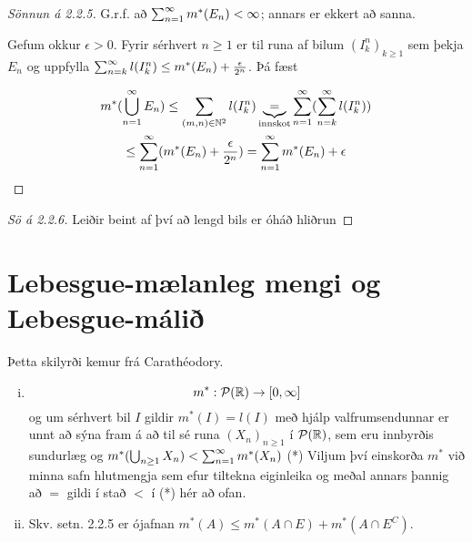 \documentclass[12pt]{book}
\newcommand{\cP}{\mathcal{P}}
\begin{document}
\begin{proof}[Sönnun á 2.2.5]
  G.r.f. að $\sum_{n = 1}^{\infty} m^*(E_n) < \infty$; annars er ekkert að sanna.

      Gefum okkur $\epsilon > 0$. Fyrir sérhvert $n \geq 1$ er til runa af bilum
      $(I^n_k)_{k \geq 1}$ sem þekja $E_n$ og uppfylla
      $\sum_{n = {k}}^{\infty} l(I^n_k) \leq m^*(E_n) + \frac{\epsilon}{2^n}$. Þá fæst

      \begin{gather*}
        m^*(\bigcup_{n=1}^{\infty} E_n) \leq \sum_{(m,n) \in \mathbb{N}^2} l(I_k^n)
          \underbrace{=}_{\text{innskot}} \sum_{n = 1}^{\infty} (\sum_{n = {k}}^{\infty} l(I^n_k))\\
          \leq \sum_{n = 1}^{\infty} (m^*(E_n) + \frac{\epsilon}{2^n}) = \sum_{n = 1}^{\infty} m^*(E_n) + \epsilon
      \end{gather*}
        
\end{proof}
\begin{proof}[Sö á 2.2.6]
     Leiðir beint af því að lengd bils er óháð hliðrun 
\end{proof}

\section{Lebesgue-mælanleg mengi og Lebesgue-málið}

Þetta skilyrði kemur frá Carathéodory.

\begin{ath} 
  \begin{enumerate}[(i)] 
  \item \[m^*:  \cP(\R) \to [0, \infty] \]
    og um sérhvert bil $I$ gildir $m^{*}(I) = l(I)$
    með hjálp valfrumsendunnar er unnt að sýna fram á að til sé runa
    $(X_n)_{n\geq1}$ í $\cP(\R)$, sem eru innbyrðis sundurlæg og $m^*(\bigcup_{n\geq1}X_n) < \sum_{n = 1}^{\infty} m^*(X_n)$ (*)
    Viljum því einskorða $ m^* $ við minna safn hlutmengja sem efur tiltekna eiginleika og meðal annars þannig að $=$ gildi
    í stað $<$ í (*) hér að ofan.

  \item Skv. setn. 2.2.5 er ójafnan $m^*(A) \leq m^*(A\cap E) + m^*(A \cap E^C)$.
     
  \end{enumerate}
\end{ath}
   
\end{document}
